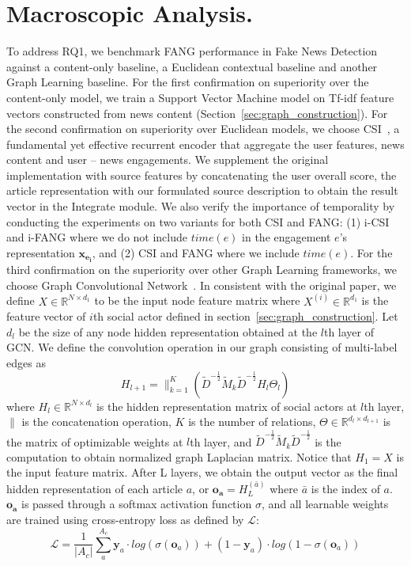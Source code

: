 \documentclass[fyp]{socreport}
\theoremstyle{definition}
\theoremstyle{hypothesis}
\begin{document}
\section{Macroscopic Analysis.}\label{sec:macroscopic}
To address RQ1, we benchmark FANG performance in Fake News Detection against a content-only baseline, a Euclidean contextual baseline and another Graph Learning baseline. For the first confirmation on superiority over the content-only model, we train a Support Vector Machine model on Tf-idf feature vectors constructed from news content (Section~\ref{sec:graph_construction}). For the second confirmation on superiority over Euclidean models, we choose CSI~\cite{ruchansky2017csi}, a fundamental yet effective recurrent encoder that aggregate the user features, news content and user -- news engagements. We supplement the original implementation with source features by concatenating the user overall score, the article representation with our formulated source description to obtain the result vector in the Integrate module. We also verify the importance of temporality by conducting the experiments on two variants for both CSI and FANG: (1) i-CSI and i-FANG where we do not include $time(e)$ in the engagement $e$'s representation $\boldsymbol{x_{e_i}}$, and (2) CSI and FANG where we include $time(e)$. For the third confirmation on the superiority over other Graph Learning frameworks, we choose Graph Convolutional Network~\cite{kipf2016semi}. In consistent with the original paper, we define $X\in \mathbb{R}^{N\times d_1}$ to be the input node feature matrix where $X^{(i)}\in \mathbb{R}^{d_1}$ is the feature vector of $i$th social actor defined in section~\ref{sec:graph_construction}. Let $d_l$ be the size of any node hidden representation obtained at the $l$th layer of GCN. We define the convolution operation in our graph consisting of multi-label edges as
\begin{equation}
    H_{l+1} = \parallel^{K}_{k=1}(\tilde{D}^{-\frac{1}{2}}\tilde{M}_k\tilde{D}^{-\frac{1}{2}}H_l\Theta_l)
\end{equation}
where $H_l\in \mathbb{R}^{N\times d_l}$ is the hidden representation matrix of social actors at $l$th layer, $\parallel$ is the concatenation operation, $K$ is the number of relations, $\Theta\in\mathbb{R}^{d_l\times d_{l+1}}$ is the matrix of optimizable weights at $l$th layer, and $\tilde{D}^{-\frac{1}{2}}\tilde{M}_k\tilde{D}^{-\frac{1}{2}}$ is the computation to obtain normalized graph Laplacian matrix. Notice that $H_1=X$ is the input feature matrix. After L layers, we obtain the output vector as the final hidden representation of each article $a$, or $\boldsymbol{o_a}=H^{(\bar{a})}_L$ where $\bar{a}$ is the index of $a$. $\boldsymbol{o_a}$ is passed through a softmax activation function $\sigma$, and all learnable weights are trained using cross-entropy loss as defined by $\mathcal{L}$:
\begin{equation}\label{eq:overall_loss}
    \mathcal{L}=\frac{1}{|A_c|}\sum^{A_c}_{a}\boldsymbol{y}_{a} \cdot log(\sigma(\boldsymbol{o}_{a}))+(1-\boldsymbol{y}_{a})\cdot log(1-\sigma(\boldsymbol{o}_{a}))
\end{equation}
\end{document}
